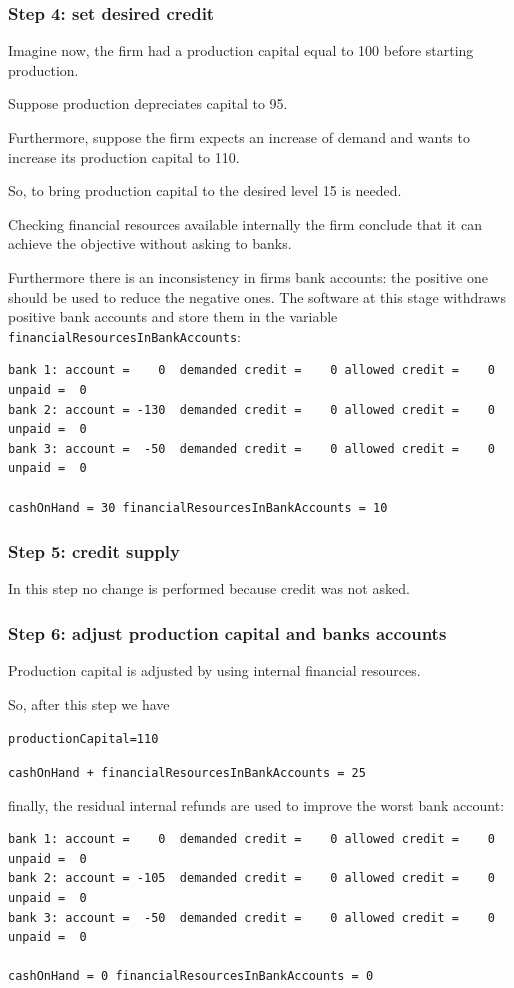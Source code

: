 \documentclass{article}
\begin{document}
	\subsubsection*{Step 4: set desired credit}
	Imagine now, the firm had a production capital equal to 100 before starting production. 
	
	Suppose production depreciates capital to 95.

	Furthermore, suppose the firm expects an increase of demand and wants to increase its production capital to 110.

	So, to bring production capital to the desired level 15 is needed.

	Checking financial resources available internally the firm conclude that it can achieve the objective without asking to banks. 

	Furthermore there is an inconsistency in firms bank accounts: the positive one should be used to reduce the negative ones. The software at this stage withdraws positive bank accounts and store them in the variable \verb+financialResourcesInBankAccounts+:

\begin{verbatim}
bank 1: account =    0  demanded credit =    0 allowed credit =    0 unpaid =  0
bank 2: account = -130  demanded credit =    0 allowed credit =    0 unpaid =  0
bank 3: account =  -50  demanded credit =    0 allowed credit =    0 unpaid =  0

cashOnHand = 30 financialResourcesInBankAccounts = 10
\end{verbatim}

	\subsubsection*{Step 5: credit supply}
In this step no change is performed because credit was not asked.

	\subsubsection*{Step 6: adjust production capital and banks accounts}

	Production capital is adjusted by using internal financial resources. 

	So, after this step we have

	\verb+productionCapital=110+

	\verb/cashOnHand + financialResourcesInBankAccounts = 25/

	finally, the residual internal refunds are used to improve the worst bank account:

\begin{verbatim}
bank 1: account =    0  demanded credit =    0 allowed credit =    0 unpaid =  0
bank 2: account = -105  demanded credit =    0 allowed credit =    0 unpaid =  0
bank 3: account =  -50  demanded credit =    0 allowed credit =    0 unpaid =  0

cashOnHand = 0 financialResourcesInBankAccounts = 0
\end{verbatim}
\end{document}
